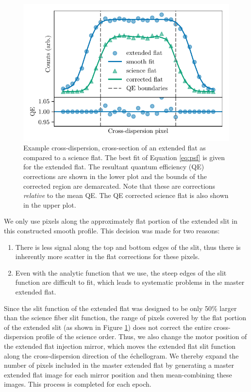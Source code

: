 \begin{figure}
\centering
\includegraphics{figures-4/flats}
\caption[Extended flat quantum efficiency correction]{Example cross-dispersion, cross-section of an extended flat as compared to a science flat. The best fit of Equation \ref{eq:psf} is given for the extended flat. The resultant quantum efficiency (QE) corrections are shown in the lower plot and the bounds of the corrected region are demarcated. Note that these are corrections \textit{relative} to the mean QE. The QE corrected science flat is also shown in the upper plot.}\label{fig:flats}
\end{figure}

We only use pixels along the approximately flat portion of the extended slit in this constructed smooth profile. This decision was made for two reasons:
\begin{enumerate}
    \item There is less signal along the top and bottom edges of the slit, thus there is inherently more scatter in the flat corrections for these pixels.
    \item Even with the analytic function that we use, the steep edges of the slit function are difficult to fit, which leads to systematic problems in the master extended flat.
\end{enumerate}
Since the slit function of the extended flat was designed to be only 50\% larger than the science fiber slit function, the range of pixels covered by the flat portion of the extended slit (as shown in Figure \ref{fig:flats}) does not correct the entire cross-dispersion profile of the science order. Thus, we also change the motor position of the extended flat injection mirror, which moves the extended flat slit function along the cross-dispersion direction of the \'echellogram. We thereby expand the number of pixels included in the master extended flat by generating a master extended flat image for each mirror position and then mean-combining these images. This process is completed for each epoch.


